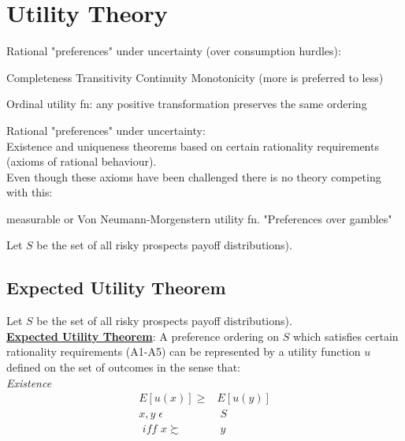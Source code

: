 \documentclass[
14pt,notheorems,hyperref={pdfauthor=whatever}
]{beamer}
\begin{document}
\section{Utility Theory}  %

\begin{frame}
Rational "preferences" under uncertainty (over consumption hurdles):\\
\begin{outline}
    \1 Completeness
    \1 Transitivity
    \1 Continuity
    \1 Monotonicity (more is preferred to less)
\end{outline}
Ordinal utility fn: any positive transformation preserves the same ordering\\
\end{frame}

\begin{frame}
Rational "preferences" under uncertainty:\\
\hfill \break
Existence and uniqueness theorems based on certain rationality requirements (axioms of rational behaviour).\\
\hfill \break
Even though these axioms have been challenged there is no theory competing with this:\\
\begin{outline}
    \1 measurable or Von Neumann-Morgenstern utility fn.
      \2 "Preferences over gambles"
\end{outline}
\hfill \break
Let $S$ be the set of all risky prospects  payoff distributions).\\
\end{frame}

\subsection{Expected Utility Theorem}

\begin{frame}
Let $S$ be the set of all risky prospects  payoff distributions).\\
\hfill \break
\underline{\textbf{Expected Utility Theorem}}: A preference ordering on $S$ which satisfies certain rationality requirements (A1-A5) can be represented by a utility function $u$ defined on the set of outcomes in the sense that:\\
\hfill \break
\textit{Existence}
\begin{align*}
    E[u(x)] \geq& E[u(y)]\\
    x, y \; \epsilon& \; S\\
    \textit{ iff } x \succsim & \; y\\
\end{align*}
\end{frame}
\end{document}

